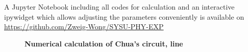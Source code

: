 \documentclass[10pt,a4paper,twocolumn,twoside,UTF8]{article}
\begin{document}
			A Jupyter Notebook including all codes for calculation and an interactive ipywidget which allows adjusting the parameters conveniently is available on \href{https://github.com/Zweig-Wong/SYSU-PHY-EXP/blob/main/C9-Chaotic_circuit/Chua/Calculation/Chua.ipynb}{https://github.com/Zweig-Wong/SYSU-PHY-EXP} 
			\begin{figure}[htbp]
				\centering
				
				\caption{\textbf{Numerical calculation of Chua's circuit, line}}
				\label{fig.1.1}
			\end{figure}
			
\end{document}
